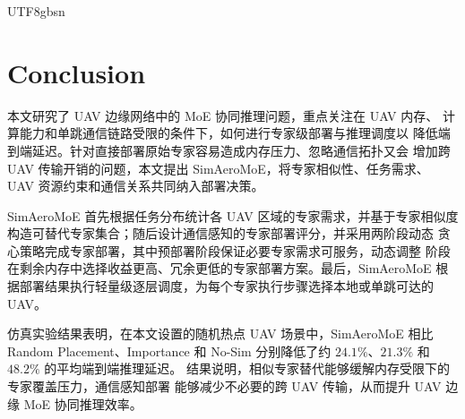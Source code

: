 \documentclass[conference]{IEEEtran}
\begin{document}
\begin{CJK*}{UTF8}{gbsn}
\section{Conclusion}
\label{sec:conclusion}

本文研究了 UAV 边缘网络中的 MoE 协同推理问题，重点关注在 UAV 内存、
计算能力和单跳通信链路受限的条件下，如何进行专家级部署与推理调度以
降低端到端延迟。针对直接部署原始专家容易造成内存压力、忽略通信拓扑又会
增加跨 UAV 传输开销的问题，本文提出 SimAeroMoE，将专家相似性、任务需求、
UAV 资源约束和通信关系共同纳入部署决策。

SimAeroMoE 首先根据任务分布统计各 UAV 区域的专家需求，并基于专家相似度
构造可替代专家集合；随后设计通信感知的专家部署评分，并采用两阶段动态
贪心策略完成专家部署，其中预部署阶段保证必要专家需求可服务，动态调整
阶段在剩余内存中选择收益更高、冗余更低的专家部署方案。最后，SimAeroMoE
根据部署结果执行轻量级逐层调度，为每个专家执行步骤选择本地或单跳可达的
UAV。

仿真实验结果表明，在本文设置的随机热点 UAV 场景中，SimAeroMoE 相比
Random Placement、Importance 和 No-Sim
分别降低了约 $24.1\%$、$21.3\%$ 和 $48.2\%$ 的平均端到端推理延迟。
结果说明，相似专家替代能够缓解内存受限下的专家覆盖压力，通信感知部署
能够减少不必要的跨 UAV 传输，从而提升 UAV 边缘 MoE 协同推理效率。




\end{CJK*}
\end{document}
